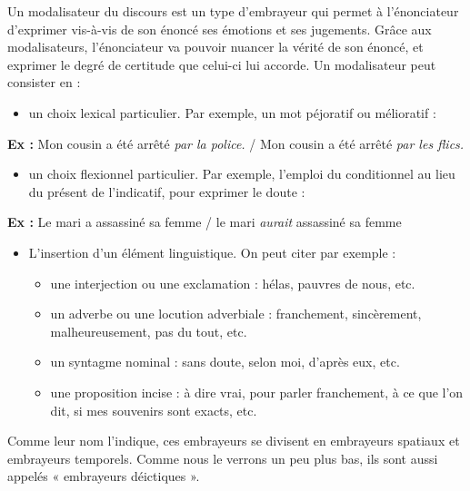 Un modalisateur du discours est un type d’embrayeur qui permet à l’énonciateur d’exprimer vis-à-vis de son énoncé ses émotions et ses jugements. Grâce aux modalisateurs, l’énonciateur va pouvoir nuancer la vérité de son énoncé, et exprimer le degré de certitude que celui-ci lui accorde. Un modalisateur peut consister en :
\begin{itemize}
\item un choix lexical particulier. Par exemple, un mot péjoratif ou mélioratif :
\end{itemize}
\textbf{Ex :} Mon cousin a été arrêté \textit{par la police.} / Mon cousin a été arrêté \textit{par les flics.}
\begin{itemize}
\item un choix flexionnel particulier. Par exemple, l’emploi du conditionnel au lieu du présent de l’indicatif, pour exprimer le doute :
\end{itemize}
\textbf{Ex :} Le mari a assassiné sa femme / le mari \textit{aurait} assassiné sa femme
\begin{itemize}
\item L’insertion d’un élément linguistique. On peut citer par exemple :
\begin{itemize}[label=--]
\item une interjection ou une exclamation : hélas, pauvres de nous, etc.
\item un adverbe ou une locution adverbiale : franchement, sincèrement, malheureusement, pas du tout, etc.
\item un syntagme nominal : sans doute, selon moi, d’après eux, etc.
\item une proposition incise : à dire vrai, pour parler franchement, à ce que l’on dit, si mes souvenirs sont exacts, etc.
\end{itemize}
\end{itemize}

Comme leur nom l’indique, ces embrayeurs se divisent en embrayeurs spatiaux et embrayeurs temporels. Comme nous le verrons un peu plus bas, ils sont aussi appelés « embrayeurs déictiques ».

